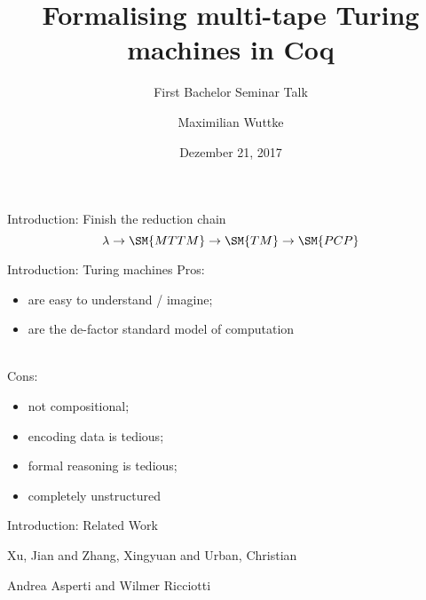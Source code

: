 

\usepackage{verbatim}

\title{Formalising multi-tape Turing machines in Coq}
\subtitle{First Bachelor Seminar Talk}
\author{Maximilian Wuttke}
\date{Dezember 21, 2017}

% 



\frame{\titlepage}

\begin{frame}{Introduction: Finish the reduction chain}
  $$\lambda \rightarrow \SM{MTTM} \rightarrow \SM{TM} \rightarrow \SM{PCP}$$
\end{frame}

\begin{frame}{Introduction: Turing machines}
  Pros:
  \begin{itemize}
    \item are easy to understand / imagine;
    \item are the de-factor standard model of computation
  \end{itemize}
  \pause \\
  Cons:
  \begin{itemize}
    \item not compositional;
    \item encoding data is tedious;
    \item formal reasoning is tedious;
    \item completely unstructured
  \end{itemize}
\end{frame}

\begin{frame}{Introduction: Related Work}
  \footnotesize
  \begin{thebibliography}{10}
    \beamertemplatearticlebibitems
    \bibitem{}
    Xu, Jian and Zhang, Xingyuan and Urban, Christian

    \bibitem{}
    Andrea Asperti and Wilmer Ricciotti

  \end{thebibliography}
\end{frame}


